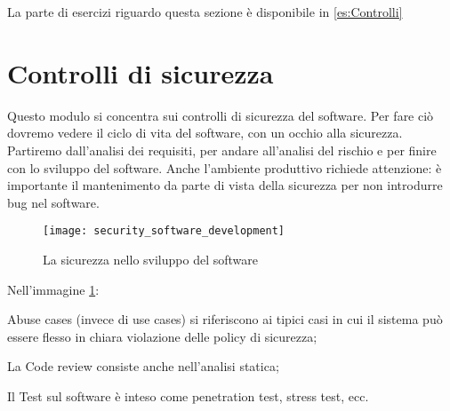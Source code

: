 La parte di esercizi riguardo questa sezione è disponibile in \ref{es:Controlli}

\part{Controlli di sicurezza}

Questo modulo si concentra sui controlli di sicurezza del software. Per fare ciò 
dovremo vedere il ciclo di vita del software, con un occhio alla sicurezza.
Partiremo dall'analisi dei requisiti, per andare all'analisi del rischio e per 
finire con lo sviluppo del software.
Anche l'ambiente produttivo richiede attenzione: è importante il mantenimento da 
parte di vista della sicurezza per non introdurre bug nel software.

\begin{figure}[h!]
        \begin{center}
                \texttt{[image: security\_software\_development]}
        \end{center}
        \caption{La sicurezza nello sviluppo del software}
        \label{fig:security:software:development}
\end{figure}



Nell'immagine \ref{fig:security:software:development}:

\begin{enumerate*}[label=\alph*)]
	\item Abuse cases (invece di use cases) si riferiscono ai  tipici 
	casi in cui il sistema può essere flesso in chiara violazione delle
	policy di sicurezza;
	\item La Code review consiste anche nell'analisi statica;
	\item Il Test sul software è inteso come penetration test, stress test, ecc.
\end{enumerate*}






